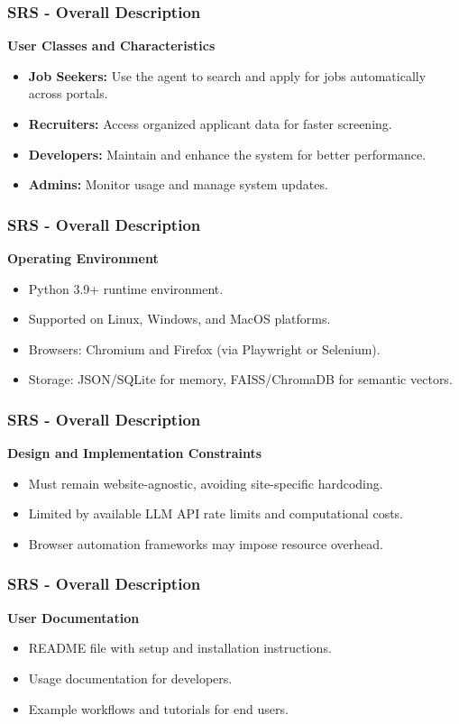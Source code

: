\documentclass{beamer}
\begin{document}
\begin{frame}
\frametitle{SRS - Overall Description}
\textbf{User Classes and Characteristics}
\begin{itemize}
    \item \textbf{Job Seekers:} Use the agent to search and apply for jobs automatically across portals.
    \item \textbf{Recruiters:} Access organized applicant data for faster screening.
    \item \textbf{Developers:} Maintain and enhance the system for better performance.
    \item \textbf{Admins:} Monitor usage and manage system updates.
\end{itemize}
\end{frame}


\begin{frame}
\frametitle{SRS - Overall Description}
\textbf{Operating Environment}
\begin{itemize}
    \item Python 3.9+ runtime environment.
    \item Supported on Linux, Windows, and MacOS platforms.
    \item Browsers: Chromium and Firefox (via Playwright or Selenium).
    \item Storage: JSON/SQLite for memory, FAISS/ChromaDB for semantic vectors.
\end{itemize}
\end{frame}

\begin{frame}
\frametitle{SRS - Overall Description}
\textbf{Design and Implementation Constraints}
\begin{itemize}
    \item Must remain website-agnostic, avoiding site-specific hardcoding.
    \item Limited by available LLM API rate limits and computational costs.
    \item Browser automation frameworks may impose resource overhead.
\end{itemize}
\end{frame}

\begin{frame}
\frametitle{SRS - Overall Description}
\textbf{User Documentation}
\begin{itemize}
    \item README file with setup and installation instructions.
    \item Usage documentation for developers.
    \item Example workflows and tutorials for end users.
\end{itemize}
\end{frame}
\end{document}
